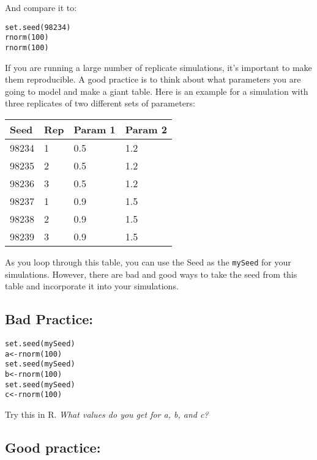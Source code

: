 \documentclass[
  letterpaper,
  DIV=11,
  numbers=noendperiod]{scrreprt}
\begin{document}
And compare it to:

\begin{verbatim}
set.seed(98234)
rnorm(100)
rnorm(100)
\end{verbatim}

If you are running a large number of replicate simulations, it's
important to make them reproducible. A good practice is to think about
what parameters you are going to model and make a giant table. Here is
an example for a simulation with three replicates of two different sets
of parameters:

\begin{longtable}[]{@{}llll@{}}
\toprule()
\textbf{Seed} & \textbf{Rep} & \textbf{Param 1} & \textbf{Param 2} \\
\midrule()
\endhead
98234 & 1 & 0.5 & 1.2 \\
98235 & 2 & 0.5 & 1.2 \\
98236 & 3 & 0.5 & 1.2 \\
98237 & 1 & 0.9 & 1.5 \\
98238 & 2 & 0.9 & 1.5 \\
98239 & 3 & 0.9 & 1.5 \\
\bottomrule()
\end{longtable}

As you loop through this table, you can use the Seed as the
\texttt{mySeed} for your simulations. However, there are bad and good
ways to take the seed from this table and incorporate it into your
simulations.

\hypertarget{bad-practice}{%
\subsection*{\texorpdfstring{\textbf{Bad
Practice:}}{Bad Practice:}}\label{bad-practice}}

\begin{verbatim}
set.seed(mySeed)
a<-rnorm(100)
set.seed(mySeed)
b<-rnorm(100)
set.seed(mySeed)
c<-rnorm(100)
\end{verbatim}

Try this in R. \emph{What values do you get for a, b, and c?}

\hypertarget{good-practice}{%
\subsection*{\texorpdfstring{\textbf{Good
practice:}}{Good practice:}}\label{good-practice}}
\end{document}
